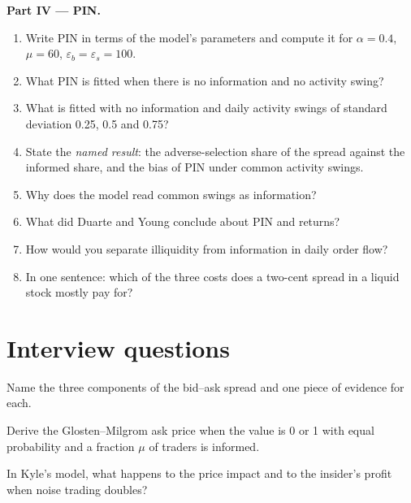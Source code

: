 \begin{problem}
\medskip\noindent\textbf{Part IV --- PIN.}
\begin{enumerate}[resume]
\item Write PIN in terms of the model's parameters and compute it for $\alpha=0.4$, $\mu=60$, $\varepsilon_b=\varepsilon_s=100$.
\item What PIN is fitted when there is no information and no activity swing?
\item What is fitted with no information and daily activity swings of standard deviation 0.25, 0.5 and 0.75?
\item State the \emph{named result}: the adverse-selection share of the spread against the informed share, and the bias of PIN under common activity swings.
\item Why does the model read common swings as information?
\item What did Duarte and Young conclude about PIN and returns?
\item How would you separate illiquidity from information in daily order flow?
\item In one sentence: which of the three costs does a two-cent spread in a liquid stock mostly pay for?
\end{enumerate}
\end{problem}

\section{Interview questions}

\begin{interviewq}\label{iq:mx:why-there-is-a-spread:1}
Name the three components of the bid--ask spread and one piece of evidence for each.
\end{interviewq}

\begin{interviewq}\label{iq:mx:why-there-is-a-spread:2}
Derive the Glosten--Milgrom ask price when the value is 0 or 1 with equal probability and a fraction $\mu$ of traders is informed.
\end{interviewq}

\begin{interviewq}\label{iq:mx:why-there-is-a-spread:3}
In Kyle's model, what happens to the price impact and to the insider's profit when noise trading doubles?
\end{interviewq}

